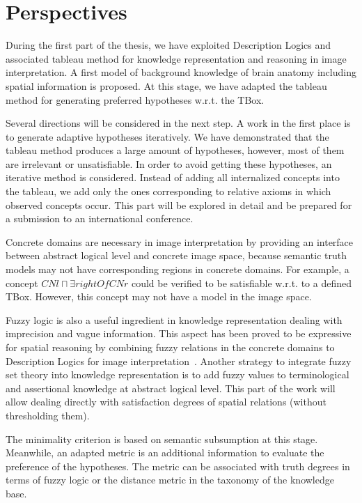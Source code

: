 \documentclass{article}
\begin{document}
\section{Perspectives}\label{sec:persp}
During the first part of the thesis, we have exploited Description Logics and associated tableau method for knowledge representation and reasoning in image interpretation.
A first model of background knowledge of brain anatomy  including spatial information is proposed.  
At this stage, we have adapted the tableau method for generating preferred hypotheses w.r.t. the TBox.

Several directions will be considered in the next step.
A work in the first place is to generate adaptive hypotheses iteratively.
We have demonstrated that the tableau method produces a large amount of hypotheses, however, most of them are irrelevant or unsatisfiable.
In order to avoid getting these hypotheses, an iterative method is considered.
Instead of adding all internalized concepts into the tableau, we add only the ones corresponding to relative axioms in which observed concepts occur.
This part will be explored in detail and be prepared for a submission to an international conference.


Concrete domains are necessary in image interpretation by providing an interface between abstract logical level and concrete image space,
because semantic truth models may not have corresponding regions in concrete domains.
For example, a concept $CNl\sqcap \exists rightOf CNr$ could be verified to be satisfiable w.r.t. to a defined TBox.
However, this concept may not have a model in the image space.

Fuzzy logic is also a useful ingredient in knowledge representation dealing with imprecision and vague information.
This aspect has been proved to be expressive for spatial reasoning by combining fuzzy relations in the concrete domains to Description Logics for image interpretation~\cite{hudelot2008spatial}.
Another strategy to integrate fuzzy set theory into knowledge representation is to add fuzzy values to terminological and assertional knowledge at abstract logical level.
This part of the work will allow dealing directly with satisfaction degrees of spatial relations (without thresholding them).

The minimality criterion is based on semantic subsumption at this stage. Meanwhile, an adapted metric is an additional information to evaluate the preference of the hypotheses.
The metric can be associated with truth degrees in terms of fuzzy logic or the distance metric in the taxonomy of the knowledge base. 
\end{document}
